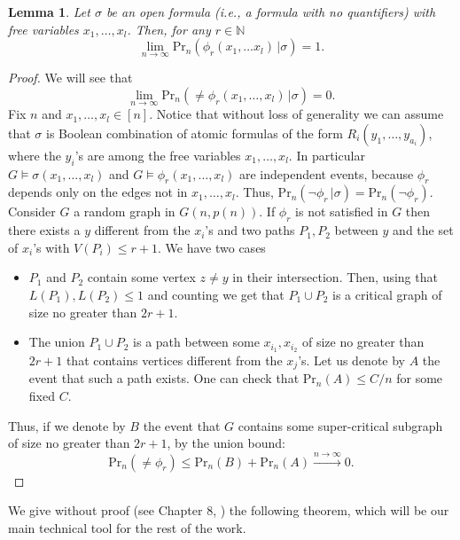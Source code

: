 \documentclass[11pt,notitlepage,a4paper]{article}
\newtheorem{lemma}{Lemma}[section]
\theoremstyle{definition}
\newcommand{\N}{\mathbb{N}}
\newcommand{\Ln}{\lim\limits_{n\to \infty}}
\begin{document}
\begin{lemma} \label{lem:faraway}
	Let $\sigma$ be an open formula (i.e., a formula with no quantifiers)
	with free variables $x_1, \dots, x_l$. Then, for any $r\in \N$
	\[ \Ln \mathrm{Pr}_n(\phi_r(x_1, \dots x_l) \, | \sigma ) =1 .\]
\end{lemma}
\begin{proof}
	We will see that
	\[ \Ln \mathrm{Pr}_n(\neq \phi_r(x_1, \dots, x_l) \, | \sigma ) =0.\]
	Fix $n$ and $x_1,\dots, x_l \in [n]$.
    Notice that without loss of generality we can
	assume that $\sigma$ is Boolean combination of atomic
	formulas of the form $R_i(y_1,\dots,y_{a_i})$, where the $y_i$'s
	are among the free variables $x_1,\dots, x_l$.
	In particular $G\models \sigma(x_1, \dots, x_l)$ and 
	$G\models \phi_r(x_1,\dots, x_l)$
	are independent events, because $\phi_r$ depends
	only on the edges not in $x_1,\dots, x_l$.
	Thus, $\mathrm{Pr}_n(\neg \phi_r \, | \sigma)= \mathrm{Pr}_n(\neg \phi_r)$.
	Consider $G$ a random graph in $G(n,p(n))$. 
	If $\phi_r$ is not satisfied in $G$ then 
	there exists a $y$ different from the $x_i$'s
	and two paths $P_1,P_2$ between $y$ and the set 
	of $x_i$'s with $V(P_i)\leq r+1$. We have two cases
	\begin{itemize}[leftmargin=*]
		\item $P_1$ and $P_2$ contain some vertex $z\neq y$
		in their intersection. Then, using that
		$L(P_1), L(P_2)\leq 1$ and counting we get that
		$P_1\cup P_2$ is a critical graph of size no greater
		than $2r+1$.
		\item The union $P_1\cup P_2$ is a path
		between some $x_{i_1}, x_{i_2}$ of size no greater
		than $2r+1$ that contains vertices different
		from the $x_j$'s. Let us denote by $A$ the event that
		such a path exists. One can check that $\mathrm{Pr}_n(A)\leq C/n$
		for some fixed $C$.   	
	\end{itemize}
	Thus, if we denote by $B$ the event that $G$ contains some 
	super-critical subgraph of size no greater than $2r+1$,  by the
	union bound:
	\[ \mathrm{Pr}_n(\neq \phi_r)\leq  \mathrm{Pr}_n(B)+ \mathrm{Pr}_n(A) 
	\stackrel{n\to \infty}{\longrightarrow}	0.\]
\end{proof}

We give without proof (see Chapter 8, \cite{lecturenotes}) the following theorem,
which will be our main technical tool for the rest of the work. 
\end{document}
